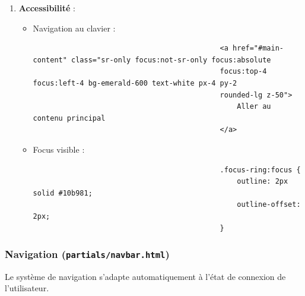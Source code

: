 \documentclass[a4paper,11pt]{article}
\begin{document}
\begin{enumerate}
                        \item \textbf{Accessibilité} :
                            \begin{itemize}
                                \item Navigation au clavier :
                                    \begin{tcolorbox}[colback=lightgray!6, colframe=black, left=-80mm, right=5mm, top=2mm, bottom=0mm, boxrule=0.1mm]
                                        \begin{verbatim}
                                            <a href="#main-content" class="sr-only focus:not-sr-only focus:absolute 
                                            focus:top-4 focus:left-4 bg-emerald-600 text-white px-4 py-2 
                                            rounded-lg z-50">
                                                Aller au contenu principal
                                            </a>
                                        \end{verbatim}
                                    \end{tcolorbox}
                                \item Focus visible :
                                    \begin{tcolorbox}[colback=lightgray!6, colframe=black, left=-45mm, right=5mm, top=2mm, bottom=0mm, boxrule=0.1mm]
                                        \begin{verbatim}
                                            .focus-ring:focus {
                                                outline: 2px solid #10b981;
                                                outline-offset: 2px;
                                            }
                                        \end{verbatim}
                                    \end{tcolorbox}
                            \end{itemize}
                    \end{enumerate}

                \subsubsection{Navigation (\texttt{partials/navbar.html})}
                    \noindent Le système de navigation s'adapte automatiquement à l'état de connexion de l'utilisateur.
\end{document}
